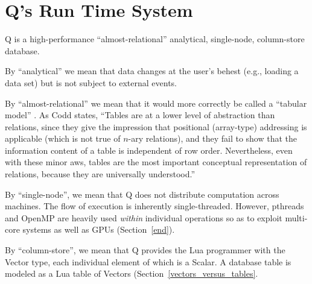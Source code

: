 \section{Q's Run Time System}

Q is a high-performance ``almost-relational'' 
analytical, single-node, column-store database. 
\be
\item 
By ``analytical'' we mean that data changes at the user's behest (e.g.,
loading a data set) but is not subject to external events.
\item 
By ``almost-relational'' we mean that it would more correctly
be called a ``tabular model'' \cite{Codd1982}. As Codd states, ``Tables are
at a lower level of abstraction than relations, since they give
the impression that positional (array-type) addressing is applicable
(which is not true of \(n\)-ary relations), and they fail to
show that the information content of a table is independent
of row order. Nevertheless, even with these minor 
aws,
tables are the most important conceptual representation of
relations, because they are universally understood.''
\item By ``single-node'', we mean that Q does not distribute computation across
  machines. The flow of execution is inherently single-threaded. However,
  pthreads and OpenMP are heavily used {\em within} individual operations so as
  to exploit multi-core systems as well as GPUs (Section~\ref{end}).
\item By ``column-store'', we mean that 
Q provides the Lua programmer with the Vector type, each
individual element of which is a Scalar. A database table is modeled as a Lua
table of Vectors (Section~\ref{vectors_versus_tables}.

\ee






